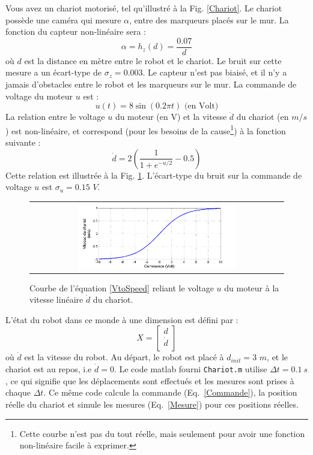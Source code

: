 \documentclass[12pt]{article}
\begin{document}
Vous avez un chariot motorisé, tel qu'illustré à la Fig. \ref{Chariot}. Le chariot possède une caméra qui mesure $\alpha$, entre des marqueurs placés sur le mur. La fonction du capteur non-linéaire sera :
\begin{equation}
\alpha = h_z(d) = \frac{0.07}{d}
\label{Mesure}
\end{equation}
où $d$ est la distance en mètre entre le robot et le chariot. Le bruit sur cette mesure a un écart-type de $\sigma_{z}=0.003$. Le capteur n'est pas biaisé, et il n'y a jamais d'obstacles entre le robot et les marqueurs sur le mur.
La commande de voltage du moteur $u$ est :
\begin{equation}
u(t) = 8\sin(0.2\pi t) \mbox{ (en Volt)}
\label{Commande}
\end{equation}
La relation entre le voltage $u$ du moteur (en V) et la vitesse $\dot{d}$ du chariot (en $m/s$) est non-linéaire, et correspond (pour les besoins de la cause\footnote{Cette courbe n'est pas du tout réelle, mais seulement pour avoir une fonction non-linéaire facile à exprimer.}) à la fonction suivante :
\begin{equation}
\dot{d} = 2(\frac{1}{1+e^{-u/2}}-0.5)
\label{VtoSpeed}
\end{equation}
Cette relation est illustrée à la Fig. \ref{CurveVolt}. L'écart-type du bruit sur la commande de voltage $u$ est $\sigma_u=0.15$ $V$.

\begin{figure}[ht]
 \begin{center}
  \begin{tabular}{c}
    \includegraphics[width=0.64\textwidth]{CurveVolt.png}
  \end{tabular}
 \end{center}
 \vspace{-0.3in}
 \caption{Courbe de l'équation \ref{VtoSpeed} reliant le voltage $u$ du moteur à la vitesse linéaire $\dot{d}$ du chariot.}
 \label{CurveVolt}
\end{figure}
L'état du robot dans ce monde à une dimension est défini par :
\begin{equation}
X = \begin{bmatrix}
d  \\
\dot{d}   \\
\end{bmatrix}
\end{equation}
où $\dot{d}$ est la vitesse du robot. Au départ, le robot est placé à $d_{init}=3$ $m$, et le chariot est au repos, i.e $\dot{d}=0$. Le code matlab fourni \texttt{Chariot.m} utilise $\Delta t=0.1~s$, ce qui signifie que les déplacements sont effectués et les mesures sont prises à chaque $\Delta t$. Ce même code calcule la commande (Eq.~\ref{Commande}), la position réelle du chariot et simule les mesures (Eq.~\ref{Mesure}) pour ces positions réelles.
\end{document}
